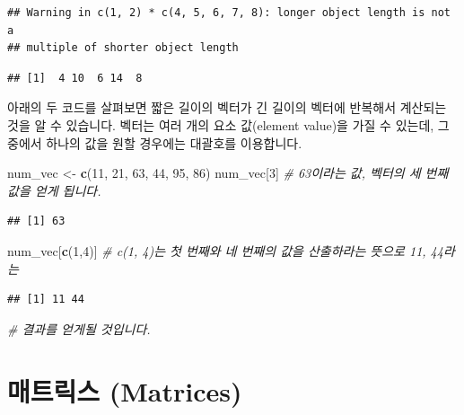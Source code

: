 \documentclass[]{book}
\newenvironment{Shaded}{\begin{snugshade}}{\end{snugshade}}
\newcommand{\CommentTok}[1]{\textcolor[rgb]{0.56,0.35,0.01}{\textit{#1}}}
\newcommand{\DecValTok}[1]{\textcolor[rgb]{0.00,0.00,0.81}{#1}}
\newcommand{\KeywordTok}[1]{\textcolor[rgb]{0.13,0.29,0.53}{\textbf{#1}}}
\newcommand{\NormalTok}[1]{#1}
\newcommand{\StringTok}[1]{\textcolor[rgb]{0.31,0.60,0.02}{#1}}
\begin{document}
\begin{verbatim}
## Warning in c(1, 2) * c(4, 5, 6, 7, 8): longer object length is not a
## multiple of shorter object length
\end{verbatim}

\begin{verbatim}
## [1]  4 10  6 14  8
\end{verbatim}

아래의 두 코드를 살펴보면 짧은 길이의 벡터가 긴 길이의 벡터에 반복해서 계산되는 것을 알 수 있습니다. 벡터는 여러 개의 요소 값(element value)을 가질 수 있는데, 그 중에서 하나의 값을 원할 경우에는 대괄호를 이용합니다.

\begin{Shaded}
\begin{Highlighting}[]
\NormalTok{num_vec <-}\StringTok{ }\KeywordTok{c}\NormalTok{(}\DecValTok{11}\NormalTok{, }\DecValTok{21}\NormalTok{, }\DecValTok{63}\NormalTok{, }\DecValTok{44}\NormalTok{, }\DecValTok{95}\NormalTok{, }\DecValTok{86}\NormalTok{)}
\NormalTok{num_vec[}\DecValTok{3}\NormalTok{]        }\CommentTok{# 63이라는 값, 벡터의 세 번째 값을 얻게 됩니다.}
\end{Highlighting}
\end{Shaded}

\begin{verbatim}
## [1] 63
\end{verbatim}

\begin{Shaded}
\begin{Highlighting}[]
\NormalTok{num_vec[}\KeywordTok{c}\NormalTok{(}\DecValTok{1}\NormalTok{,}\DecValTok{4}\NormalTok{)]   }\CommentTok{# c(1, 4)는 첫 번째와 네 번째의 값을 산출하라는 뜻으로 11, 44라는}
\end{Highlighting}
\end{Shaded}

\begin{verbatim}
## [1] 11 44
\end{verbatim}

\begin{Shaded}
\begin{Highlighting}[]
                  \CommentTok{# 결과를 얻게될 것입니다.}
\end{Highlighting}
\end{Shaded}

\hypertarget{uxb9e4uxd2b8uxb9aduxc2a4-matrices}{%
\section{매트릭스 (Matrices)}\label{uxb9e4uxd2b8uxb9aduxc2a4-matrices}}
\end{document}
